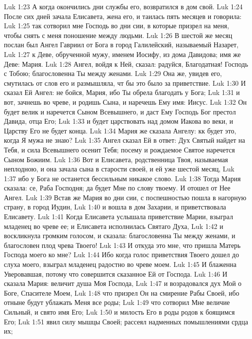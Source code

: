 \vs Luk 1:23 А когда окончились дни службы его, возвратился в дом свой.
\vs Luk 1:24 После сих дней зачала Елисавета, жена его, и таилась пять месяцев и говорила:
\vs Luk 1:25 так сотворил мне Господь во дни сии, в которые призрел на меня, чтобы снять с меня поношение между людьми.
\rsbpar\vs Luk 1:26 В шестой же месяц послан был Ангел Гавриил от Бога в город Галилейский, называемый Назарет,
\vs Luk 1:27 к Деве, обрученной мужу, именем Иосифу, из дома Давидова; имя же Деве: Мария.
\vs Luk 1:28 Ангел, войдя к Ней, сказал: радуйся, Благодатная! Господь с Тобою; благословенна Ты между женами.
\vs Luk 1:29 Она же, увидев его, смутилась от слов его и размышляла, чт бы это было за приветствие.
\vs Luk 1:30 И сказал Ей Ангел: не бойся, Мария, ибо Ты обрела благодать у Бога;
\vs Luk 1:31 и вот, зачнешь во чреве, и родишь Сына, и наречешь Ему имя: Иисус.
\vs Luk 1:32 Он будет велик и наречется Сыном Всевышнего, и даст Ему Господь Бог престол Давида, отца Его;
\vs Luk 1:33 и будет царствовать над домом Иакова во веки, и Царству Его не будет конца.
\vs Luk 1:34 Мария же сказала Ангелу: кк будет это, когда Я мужа не знаю?
\vs Luk 1:35 Ангел сказал Ей в ответ: Дух Святый найдет на Тебя, и сила Всевышнего осенит Тебя; посему и рождаемое Святое наречется Сыном Божиим.
\vs Luk 1:36 Вот и Елисавета, родственница Твоя, называемая неплодною, и она зачала сына в старости своей, и ей уже шестой месяц,
\vs Luk 1:37 ибо у Бога не останется бессильным никакое слово.
\vs Luk 1:38 Тогда Мария сказала: се, Раба Господня; да будет Мне по слову твоему. И отошел от Нее Ангел.
\rsbpar\vs Luk 1:39 Встав же Мария во дни сии, с поспешностью пошла в нагорную страну, в город Иудин,
\vs Luk 1:40 и вошла в дом Захарии, и приветствовала Елисавету.
\vs Luk 1:41 Когда Елисавета услышала приветствие Марии, взыграл младенец во чреве ее; и Елисавета исполнилась Святаго Духа,
\vs Luk 1:42 и воскликнула громким голосом, и сказала: благословенна Ты между женами, и благословен плод чрева Твоего!
\vs Luk 1:43 И откуда это мне, что пришла Матерь Господа моего ко мне?
\vs Luk 1:44 Ибо когда голос приветствия Твоего дошел до слуха моего, взыграл младенец радостно во чреве моем.
\vs Luk 1:45 И блаженна Уверовавшая, потому что совершится сказанное Ей от Господа.
\vs Luk 1:46 И сказала Мария: величит душа Моя Господа,
\vs Luk 1:47 и возрадовался дух Мой о Боге, Спасителе Моем,
\vs Luk 1:48 что призрел Он на смирение Рабы Своей, ибо отныне будут ублажать Меня все роды;
\vs Luk 1:49 что сотворил Мне величие Сильный, и свято имя Его;
\vs Luk 1:50 и милость Его в роды родов к боящимся Его;
\vs Luk 1:51 явил силу мышцы Своей; рассеял надменных помышлениями срдца их;
